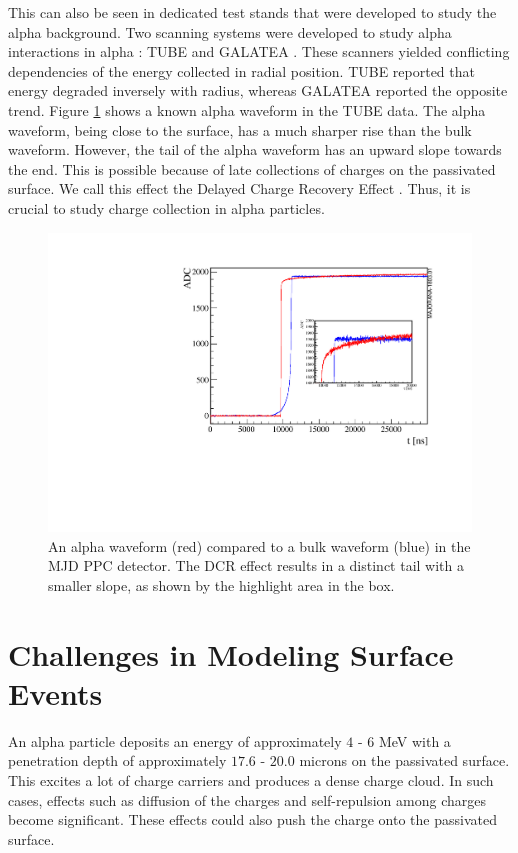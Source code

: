 This can also be seen in dedicated test stands that were developed to study the alpha background. Two scanning systems were developed to study alpha interactions in alpha : TUBE \cite{TUBE_paper} and GALATEA \cite{galatea_paper}. These scanners yielded conflicting dependencies of the energy collected in radial position. TUBE reported that energy degraded inversely with radius, whereas GALATEA reported the opposite trend. Figure \ref{fig:dcr_waveform} shows a known alpha waveform in the TUBE data. The alpha waveform, being close to the surface, has a much sharper rise than the bulk waveform. However, the tail of the alpha waveform has an upward slope towards the end. This is possible because of late collections of charges on the passivated surface. We call this effect the Delayed Charge Recovery Effect \cite{Gruszko:2017kfx}. Thus, it is crucial to study charge collection in alpha particles.

\begin{figure}[!htb]
\centering
\includegraphics[width=0.9\linewidth]{ch3/figs/dcr_waveform.pdf}
\caption{An alpha waveform (red) compared to a bulk waveform (blue) in the MJD PPC detector. The DCR effect results in a distinct tail with a smaller slope, as shown by the highlight area in the box.\cite{TUBE_paper}}
\label{fig:dcr_waveform}
\end{figure}

\section{Challenges in Modeling Surface Events}
An alpha particle deposits an energy of approximately $4$ - $6$ MeV with a penetration depth of approximately $17.6$ - $20.0$ microns on the passivated surface. This excites a lot of charge carriers and produces a dense charge cloud. In such cases, effects such as diffusion of the charges and self-repulsion among charges become significant. These effects could also push the charge onto the passivated surface. 

